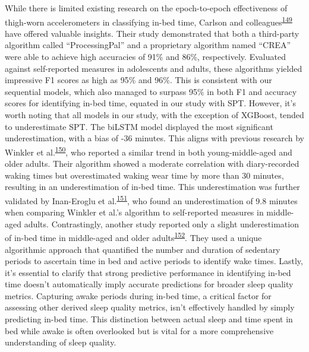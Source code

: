 \documentclass[
  9pt,
]{scrbook}
\begin{document}
While there is limited existing research on the epoch-to-epoch
effectiveness of thigh-worn accelerometers in classifying in-bed time,
Carlson and
colleagues\textsuperscript{\protect\hyperlink{ref-carlson_validity_2021}{149}}
have offered valuable insights. Their study demonstrated that both a
third-party algorithm called ``ProcessingPal'' and a proprietary
algorithm named ``CREA'' were able to achieve high accuracies of 91\%
and 86\%, respectively. Evaluated against self-reported measures in
adolescents and adults, these algorithms yielded impressive F1 scores as
high as 95\% and 96\%. This is consistent with our sequential models,
which also managed to surpass 95\% in both F1 and accuracy scores for
identifying in-bed time, equated in our study with SPT. However, it's
worth noting that all models in our study, with the exception of
XGBoost, tended to underestimate SPT. The biLSTM model displayed the
most significant underestimation, with a bias of -36 minutes. This
aligns with previous research by Winkler et
al.\textsuperscript{\protect\hyperlink{ref-winkler_identifying_2016}{150}},
who reported a similar trend in both young-middle-aged and older adults.
Their algorithm showed a moderate correlation with diary-recorded waking
times but overestimated waking wear time by more than 30 minutes,
resulting in an underestimation of in-bed time. This underestimation was
further validated by Inan-Eroglu et
al.\textsuperscript{\protect\hyperlink{ref-inan-eroglu_comparison_2021}{151}},
who found an underestimation of 9.8 minutes when comparing Winkler et
al.'s algorithm to self-reported measures in middle-aged adults.
Contrastingly, another study reported only a slight underestimation of
in-bed time in middle-aged and older
adults\textsuperscript{\protect\hyperlink{ref-van_der_berg_identifying_2016}{152}}.
They used a unique algorithmic approach that quantified the number and
duration of sedentary periods to ascertain time in bed and active
periods to identify wake times. Lastly, it's essential to clarify that
strong predictive performance in identifying in-bed time doesn't
automatically imply accurate predictions for broader sleep quality
metrics. Capturing awake periods during in-bed time, a critical factor
for assessing other derived sleep quality metrics, isn't effectively
handled by simply predicting in-bed time. This distinction between
actual sleep and time spent in bed while awake is often overlooked but
is vital for a more comprehensive understanding of sleep quality.
\end{document}

